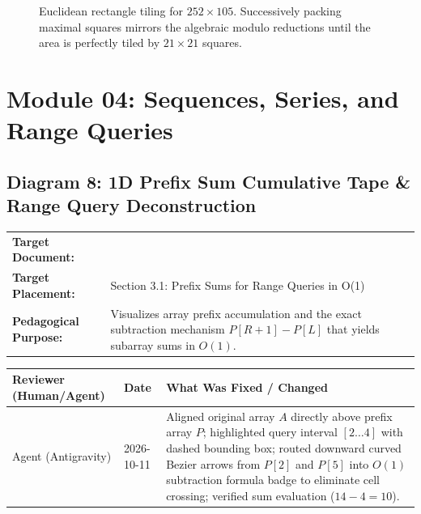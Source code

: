 \documentclass[11pt,a4paper]{article}
\newcommand{\breadcrumb}[3]{
    \par\vspace{0.15cm}
    \noindent\begin{tabularx}{\textwidth}{|l|X|}
    \hline
    \textbf{Target Document:} & \texttt{\detokenize{#1}} \\
    \textbf{Target Placement:} & #2 \\
    \textbf{Pedagogical Purpose:} & #3 \\
    \hline
    \end{tabularx}
    \vspace{0.15cm}\par
}
\newcommand{\diagramaudit}[3]{
    \par\vspace{0.12cm}
    \noindent\begin{tabularx}{\textwidth}{|l|l|>{\raggedright\arraybackslash}X|}
    \hline
    \textbf{Reviewer (Human/Agent)} & \textbf{Date} & \textbf{What Was Fixed / Changed} \\ \hline
    #1 & #2 & #3 \\ \hline
    \end{tabularx}
    \vspace{0.12cm}\par
}
\begin{document}
\begin{figure}[htbp]
\caption{Euclidean rectangle tiling for $252 \times 105$. Successively packing maximal squares mirrors the algebraic modulo reductions until the area is perfectly tiled by $21 \times 21$ squares.}
\end{figure}

\newpage
\section{Module 04: Sequences, Series, and Range Queries}

\subsection{Diagram 8: 1D Prefix Sum Cumulative Tape \& Range Query Deconstruction}

\breadcrumb{04.sequences_and_series.tex}{Section 3.1: Prefix Sums for Range Queries in O(1)}{Visualizes array prefix accumulation and the exact subtraction mechanism $P[R+1] - P[L]$ that yields subarray sums in $O(1)$.}

\diagramaudit{Agent (Antigravity)}{2026-10-11}{Aligned original array $A$ directly above prefix array $P$; highlighted query interval $[2 \dots 4]$ with dashed bounding box; routed downward curved Bezier arrows from $P[2]$ and $P[5]$ into $O(1)$ subtraction formula badge to eliminate cell crossing; verified sum evaluation ($14 - 4 = 10$).}
\end{document}
